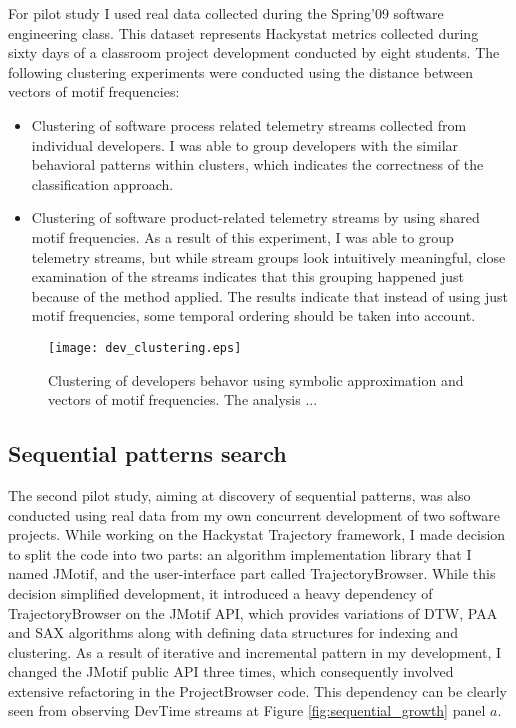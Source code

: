 For pilot study I used real data collected during the Spring'09 software engineering class. This dataset represents Hackystat metrics collected during sixty days of a classroom project development conducted by eight students. The following clustering experiments were conducted using the distance between vectors of motif frequencies:
\begin{itemize}
	\item Clustering of software process related telemetry streams collected from individual developers. I was able to group developers with the similar behavioral patterns within clusters, which indicates the correctness of the classification approach.
	\item Clustering of software product-related telemetry streams by using shared motif frequencies. As a result of this experiment, I was able to group telemetry streams, but while stream groups look intuitively meaningful, close examination of the streams indicates that this grouping happened just because of the method applied. The results indicate that instead of using just motif frequencies, some temporal ordering should be taken into account.
\end{itemize}

\begin{figure}[tbp]
   \centering
   \texttt{[image: dev\_clustering.eps]}
   \caption{Clustering of developers behavor using symbolic approximation and vectors of motif frequencies. The analysis ...}
   \label{fig:cluster_developers}
\end{figure}

\subsection{Sequential patterns search}
The second pilot study, aiming at discovery of sequential patterns, was also conducted using real data from my own concurrent development of two software projects. While working on the Hackystat Trajectory framework, I made decision to split the code into two parts: an algorithm implementation library that I named JMotif, and the user-interface part called TrajectoryBrowser. While this decision simplified development, it introduced a heavy dependency of TrajectoryBrowser on the JMotif API, which provides variations of DTW, PAA and SAX algorithms along with defining data structures for indexing and clustering. As a result of iterative and incremental pattern in my development, I changed the JMotif public API three times, which consequently involved extensive refactoring in the ProjectBrowser code. This dependency can be clearly seen from observing DevTime streams at Figure \ref{fig:sequential_growth} panel $a$. 

